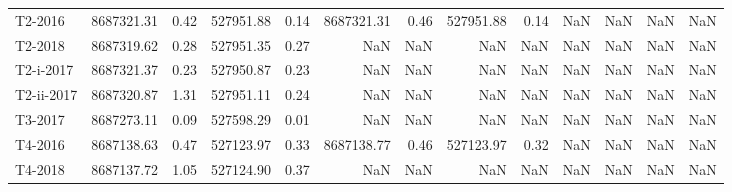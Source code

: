 \begin{tabular}{lrrrrrrrrrrrr}
     T2-2016 &                8687321.31 &                            0.42 &                527951.88 &                           0.14 &                8687321.31 &                            0.46 &                527951.88 &                           0.14 &                       NaN &                             NaN &                      NaN &                            NaN \\
     T2-2018 &                8687319.62 &                            0.28 &                527951.35 &                           0.27 &                       NaN &                             NaN &                      NaN &                            NaN &                       NaN &                             NaN &                      NaN &                            NaN \\
   T2-i-2017 &                8687321.37 &                            0.23 &                527950.87 &                           0.23 &                       NaN &                             NaN &                      NaN &                            NaN &                       NaN &                             NaN &                      NaN &                            NaN \\
  T2-ii-2017 &                8687320.87 &                            1.31 &                527951.11 &                           0.24 &                       NaN &                             NaN &                      NaN &                            NaN &                       NaN &                             NaN &                      NaN &                            NaN \\
     T3-2017 &                8687273.11 &                            0.09 &                527598.29 &                           0.01 &                       NaN &                             NaN &                      NaN &                            NaN &                       NaN &                             NaN &                      NaN &                            NaN \\
     T4-2016 &                8687138.63 &                            0.47 &                527123.97 &                           0.33 &                8687138.77 &                            0.46 &                527123.97 &                           0.32 &                       NaN &                             NaN &                      NaN &                            NaN \\
     T4-2018 &                8687137.72 &                            1.05 &                527124.90 &                           0.37 &                       NaN &                             NaN &                      NaN &                            NaN &                       NaN &                             NaN &                      NaN &                            NaN \\

\end{tabular}

